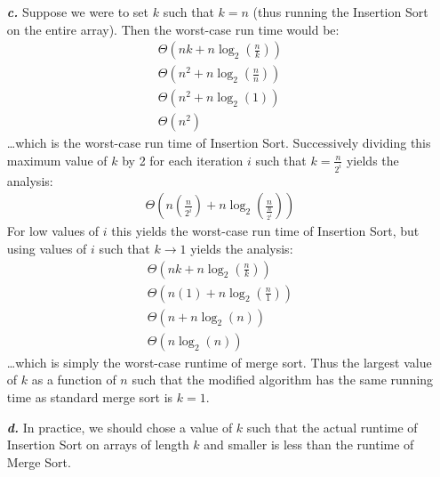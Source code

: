 \documentclass{article}
\begin{document}
\begin{enumerate}
	\item[\textbf{\textit{c.}}] Suppose we were to set $k$ such that $k = n$ (thus running the Insertion Sort on the entire array). Then the worst-case run time would be:
	\begin{eqnarray*}
		\Theta(nk + n \log_2(\frac{n}{k})) \\
		\Theta(n^2 + n \log_2(\frac{n}{n})) \\
		\Theta(n^2 + n \log_2(1)) \\
		\Theta(n^2)
	\end{eqnarray*}
	\ldots which is the worst-case run time of Insertion Sort. Successively dividing this maximum value of $k$ by 2 for each iteration $i$ such that $k = \frac{n}{2^i}$ yields the analysis:
	\begin{eqnarray*}
		\Theta \left ( n \left ( \frac{n}{2^i} \right ) + n \log_2 \left ( \frac{n}{\frac{n}{2^i}} \right ) \right )
	\end{eqnarray*}
	For low values of $i$ this yields the worst-case run time of Insertion Sort, but using values of $i$ such that $k \rightarrow 1$ yields the analysis:
	\begin{eqnarray*}
		\Theta \left ( nk + n \log_2 \left ( \frac{n}{k} \right ) \right ) \\
		\Theta \left ( n(1) + n \log_2 \left ( \frac{n}{1} \right ) \right ) \\
		\Theta \left ( n + n \log_2 \left ( n \right ) \right ) \\
		\Theta \left (n \log_2 \left ( n \right ) \right )
	\end{eqnarray*}
	\ldots which is simply the worst-case runtime of merge sort. Thus the largest value of $k$ as a function of $n$ such that the modified algorithm has the same running time as standard merge sort is $k = 1$.

	\item[\textbf{\textit{d.}}] In practice, we should chose a value of $k$ such that the actual runtime of Insertion Sort on arrays of length $k$ and smaller is less than the runtime of Merge Sort.
\end{enumerate}
\end{document}
